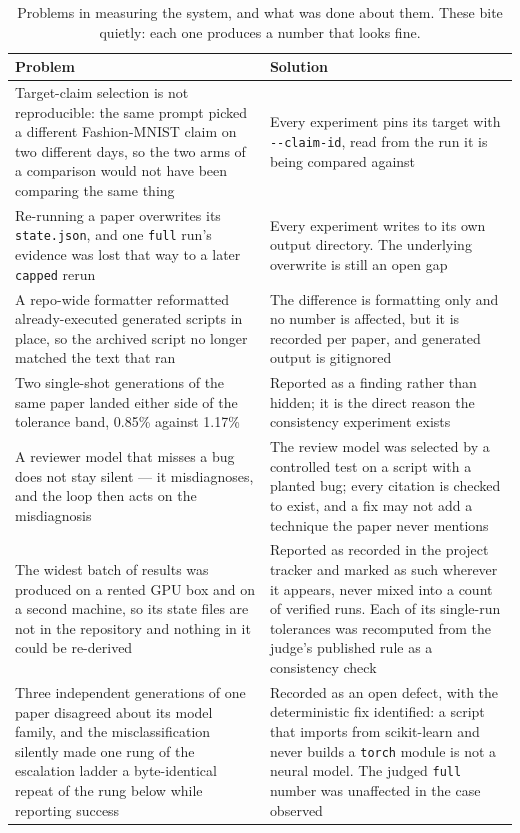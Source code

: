 \documentclass[10pt,twocolumn]{article}
\newcommand{\squeeze}{\setlength{\tabcolsep}{4pt}}
\begin{document}
\begin{table}[tbp]
\centering
\small
\caption{Problems in measuring the system, and what was done about them. These bite quietly: each
one produces a number that looks fine.}
\label{tab:measurement}
\squeeze
\begin{tabular}{L{0.47\textwidth}L{0.47\textwidth}}
\toprule
Problem & Solution \\
\midrule
Target-claim selection is not reproducible: the same prompt picked a different Fashion-MNIST
  claim on two different days, so the two arms of a comparison would not have been comparing the
  same thing & Every experiment pins its target with \texttt{-{}-claim-id}, read from the run it is
  being compared against \\
Re-running a paper overwrites its \texttt{state.json}, and one \texttt{full} run's evidence was
  lost that way to a later \texttt{capped} rerun & Every experiment writes to its own output
  directory. The underlying overwrite is still an open gap \\
A repo-wide formatter reformatted already-executed generated scripts in place, so the archived
  script no longer matched the text that ran & The difference is formatting only and no number is
  affected, but it is recorded per paper, and generated output is gitignored \\
Two single-shot generations of the same paper landed either side of the tolerance band, 0.85\%
  against 1.17\% & Reported as a finding rather than hidden; it is the direct reason the
  consistency experiment exists \\
A reviewer model that misses a bug does not stay silent --- it misdiagnoses, and the loop then
  acts on the misdiagnosis & The review model was selected by a controlled test on a script with a
  planted bug; every citation is checked to exist, and a fix may not add a technique the paper
  never mentions \\
The widest batch of results was produced on a rented GPU box and on a second machine, so its
  state files are not in the repository and nothing in it could be re-derived & Reported as
  recorded in the project tracker and marked as such wherever it appears, never mixed into a
  count of verified runs. Each of its single-run tolerances was recomputed from the judge's
  published rule as a consistency check \\
Three independent generations of one paper disagreed about its model family, and the
  misclassification silently made one rung of the escalation ladder a byte-identical repeat of the
  rung below while reporting success & Recorded as an open defect, with the deterministic fix
  identified: a script that imports from scikit-learn and never builds a \texttt{torch} module is
  not a neural model. The judged \texttt{full} number was unaffected in the case observed \\
\bottomrule
\end{tabular}
\end{table}
\end{document}
